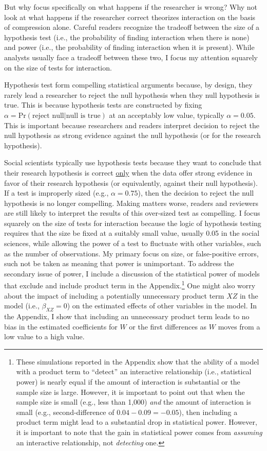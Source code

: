 \documentclass[12pt]{article}
\begin{document}
But why focus specifically on what happens if the researcher is wrong? Why not look at what happens if the researcher correct theorizes interaction on the basis of compression alone. Careful readers recognize the tradeoff between the size of a hypothesis test (i.e., the probability of finding interaction when there is none) and power (i.e., the probability of finding interaction when it is present). While analysts usually face a tradeoff between these two, I focus my attention squarely on the size of tests for interaction.

Hypothesis test form compelling statistical arguments because, by design, they rarely lead a researcher to reject the null hypothesis when they null hypothesis is true. This is because hypothesis tests are constructed by fixing $\alpha = \text{Pr}(\text{reject null} | \text{null is true})$  at an acceptably low value, typically $\alpha = 0.05$. This is important because researchers and readers interpret decision to reject the null hypothesis as strong evidence against the null hypothesis (or for the research hypothesis).

Social scientists typically use hypothesis tests because they want to conclude that their research hypothesis is correct \underline{only} when the data offer strong evidence in favor of their research hypothesis (or equivalently, against their null hypothesis). If a test is improperly sized (e.g., $\alpha = 0.75$), then the decision to reject the null hypothesis is no longer compelling. Making matters worse, readers and reviewers are still likely to interpret the results of this over-sized test as compelling. I focus squarely on the size of tests for interaction because the logic of hypothesis testing requires that the size be fixed at a suitably small value, usually 0.05 in the social sciences, while allowing the power of a test to fluctuate with other variables, such as the number of observations. My primary focus on size, or false-positive errors, such not be taken as meaning that power is unimportant. To address the secondary issue of power, I include a discussion of the statistical power of models that exclude and include product term in the Appendix.\footnote{These simulations reported in the Appendix show that the ability of a model with a product term to ``detect'' an interactive relationship (i.e., statistical power) is nearly equal if the amount of interaction is substantial or the sample size is large. However, it is important to point out that when the sample size is small (e.g., less than 1,000) \textit{and} the amount of interaction is small (e.g., second-difference of $0.04 - 0.09 = -0.05$), then including a product term might lead to a substantial drop in statistical power. However, it is important to note that the gain in statistical power comes from \textit{assuming} an interactive relationship, not \textit{detecting} one.} One might also worry about the impact of including a potentially unnecessary product term $XZ$ in the model (i.e., $\beta_{XZ} = 0$) on the estimated effects of other variables in the model. In the Appendix, I show that including an unnecessary product term leads to no bias in the estimated coefficients for $W$ or the first differences as $W$ moves from a low value to a high value.
\end{document}
